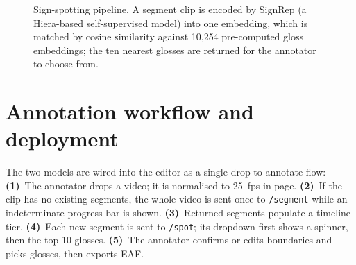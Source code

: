 \documentclass[11pt]{article}
\newcommand{\sub}{\normalfont\scriptsize\color{gray!55!black}}
\begin{document}
\begin{figure}[t]
\centering
{}
\caption{Sign-spotting pipeline. A segment clip is encoded by SignRep (a Hiera-based self-supervised
model) into one embedding, which is matched by cosine similarity against 10{,}254 pre-computed gloss
embeddings; the ten nearest glosses are returned for the annotator to choose from.}
\label{fig:spot}
\end{figure}

\section{Annotation workflow and deployment}\label{sec:workflow}
The two models are wired into the editor as a single drop-to-annotate flow:
\textbf{(1)}~The annotator drops a video; it is normalised to 25~fps in-page.
\textbf{(2)}~If the clip has no existing segments, the whole video is sent once to \texttt{/segment}
while an indeterminate progress bar is shown.
\textbf{(3)}~Returned segments populate a timeline tier.
\textbf{(4)}~Each new segment is sent to \texttt{/spot}; its dropdown first shows a spinner, then the
top-10 glosses.
\textbf{(5)}~The annotator confirms or edits boundaries and picks glosses, then exports EAF.
\end{document}
